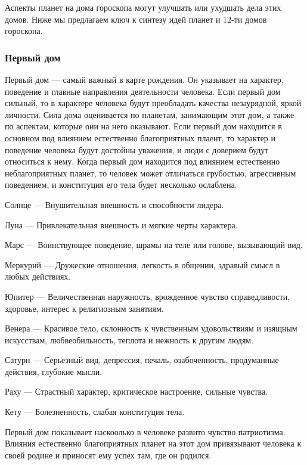 Аспекты планет на дома гороскопа могут улучшать или ухудшать дела этих домов. Ниже мы предлагаем ключ к синтезу идей планет и 12-ти домов гороскопа.

\subsubsection*{Первый дом}

Первый дом --- самый важный в карте рождения. Он указывает на характер, поведение и главные направления деятельности человека. Если первый дом сильный, то в характере человека будут преобладать качества незаурядной, яркой личности. Сила дома оценивается по планетам, занимающим этот дом, а также по аспектам, которые они на него оказывают. Если первый дом находится в основном под влиянием естественно благоприятных плаент, то характер и поведение человека будут достойны уважения, и люди с доверием будут относиться к нему. Когда первый дом находится под влиянием естественно неблагоприятных планет, то человек может отличаться грубостью, агрессивным поведением, и конституция его тела будет несколько ослаблена.

\begin{myenum}
	\item Солнце --- Внушительная внешность и способности лидера.
	\item Луна --- Привлекательная внешность и мягкие черты характера.
	\item Марс --- Воинствующее поведение, шрамы на теле или голове, вызывающий вид.
	\item Меркурий --- Дружеские отношения, легкость в общении, здравый смысл в любых действиях.
	\item Юпитер --- Величественная наружность, врожденное чувство справедливости, здоровье, интерес к религиозным занятиям.
	\item Венера --- Красивое тело, склонность к чувственным удовольствиям и изящным искусствам, любвеобильность, теплота и нежность к другим людям.
	\item Сатурн --- Серьезный вид, депрессия, печаль, озабоченность, продуманные действия, глубокие мысли.
	\item Раху --- Страстный характер, критическое настроение, сильные чувства.
	\item Кету --- Болезненность, слабая конституция тела.
\end{myenum}

Первый дом показывает наскоолько в человеке развито чувство патриотизма. Влияния естественно благоприятных планет на этот дом привязывают человека к своей родине и приносят ему успех там, где он родился.

